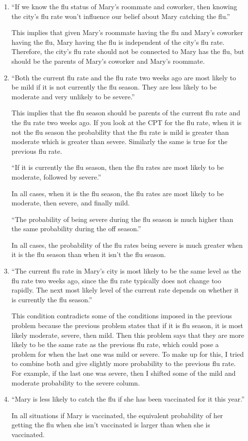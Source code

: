 \documentclass[12pt]{article}
\begin{document}
\begin{enumerate}
	\item ``If we know the flu status of Mary's roommate and coworker, then knowing the
	city's flu rate won't influence our belief about Mary catching the flu.''
	
	This implies that given Mary's roommate having the flu and Mary's coworker having
	the flu, Mary having the flu is independent of the city's flu rate. Therefore, the
	city's flu rate should not be connected to Mary has the flu, but should be the parents
	of Mary's coworker and Mary's roommate.
	
	\item ``Both the current flu rate and the flu rate two weeks ago are most likely to
	be mild if it is not currently the flu season. They are less likely to be moderate and 
	very unlikely to be severe.''
	
	This implies that the flu season should be parents of the current flu rate and the
	flu rate two weeks ago. If you look at the CPT for the flu rate, when it is not the flu season
	the probability that the flu rate is mild is greater than moderate which is greater
	than severe. Similarly the same is true for the previous flu rate.
	
	``If it is currently the flu season, then the flu rates are most likely to be moderate,
	followed by severe.''
	
	In all cases, when it is the flu season, the flu rates are most likely to be moderate, then
	severe, and finally mild.
	
	``The probability of being severe during the flu season is much higher than the same
	probability during the off season.''
	
	In all cases, the probability of the flu rates being severe is much greater when it is the
	flu season than when it isn't the flu season.
	
	\item ``The current flu rate in Mary's city is most likely to be the same level as the flu
	rate two weeks ago, since the flu rate typically does not change too rapidly. The next
	most likely level of the current rate depends on whether it is currently the flu season.''
	
	This condition contradicts some of the conditions imposed in the previous problem 
	because the previous problem states that if it is flu season, it is most likely moderate,
	severe, then mild. Then this problem says that they are more likely to be the same rate
	as the previous flu rate, which could pose a problem for when the last one was mild or
	severe. To make up for this, I tried to combine both and give slightly more probability
	to the previous flu rate. For example, if the last one was severe, then I shifted some of the
	mild and moderate probability to the severe column.

	\item ``Mary is less likely to catch the flu if she has been vaccinated for it this year.''
	
	In all situations if Mary is vaccinated, the equivalent probability of her getting the flu
	when she isn't vaccinated is larger than when she is vaccinated.

\end{enumerate}
\end{document}
